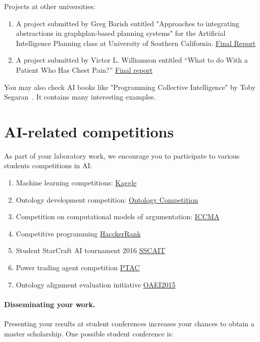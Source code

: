 \documentclass[a4paper,12pt]{report}
\begin{document}
Projects at other universities:
\begin{enumerate}
 \item A project submitted by Greg Barish entitled "Approaches to integrating abstractions in graphplan-based planning systems" for the Artificial Intelligence Planning class at University of Southern California.
\href{http://www.isi.edu/~blythe/cs541/Projects/barish.pdf}{Final Report}
\item A project submitted by Victor L. Williamson entitled ``What to do With a Patient Who Has
Chest Pain?'' \href{http://ocw.mit.edu/courses/electrical-engineering-and-computer-science/6-871-knowledge-based-applications-systems-spring-2005/projects/william_cp_ches.pdf}{Final report}
\end{enumerate}

You may also check AI books like "Programming Collective Intelligence" by Toby Segaran~\cite{book:1527985}. 
It contains many interesting examples.

\section{AI-related competitions}
As part of your laboratory work, we encourage you to participate to various students competitions in AI:

\begin{enumerate}
\item Machine learning competitions: \href{https://www.kaggle.com/}{Kaggle}
\item Ontology development competition: \href{http://fois2014.inf.ufes.br/p/call-for-ontology-competition.html}{Ontology Competition}
\item Competition on computational models of argumentation: \href{http://argumentationcompetition.org/}{ICCMA}
\item Competitive programming \href{https://www.hackerrank.com/domains}{HacckerRank}
\item Student StarCraft AI tournament 2016 \href{http://sscaitournament.com/}{SSCAIT}
\item Power trading agent competition \href{http://www.powertac.org/node/39}{PTAC}
\item Ontology alignment evaluation initiative \href{http://oaei.ontologymatching.org/2015/}{OAEI2015}
\end{enumerate}

\paragraph{Disseminating your work.}
 Presenting your results at student conferences increases your chances to obtain a master scholarship. 
 One possible student conference is:
\end{document}
